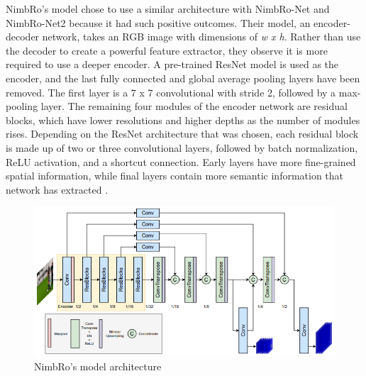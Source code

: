 NimbRo's model chose to use a similar architecture with NimbRo-Net and NimbRo-Net2 because it had such positive outcomes.
Their model, an encoder-decoder network, takes an RGB image with dimensions of \emph{w x h}. Rather than use the decoder to create a powerful feature extractor, they observe it is more required to use a deeper encoder.
A pre-trained ResNet model \parencite{he2016} is used as the encoder, and the last fully connected and global average pooling layers have been removed.
The first layer is a 7 x 7 convolutional with stride 2, followed by a max-pooling layer.  The remaining four modules of the encoder network are residual blocks, which have lower resolutions and higher depths as the number of modules rises.
Depending on the ResNet architecture that was chosen, each residual block is made up of two or three convolutional layers, followed by batch normalization, ReLU activation, and a shortcut connection. Early layers have more fine-grained spatial information,
while final layers contain more semantic information that network has extracted \parencite{amini2021}.

\begin{figure}[ht]
  \centering
  \includegraphics[scale=1]{gambar/nimbro-architecture.png}
  \caption{NimbRo's model architecture}
  \label{fig:nimbro-model-architecture}
\end{figure}

